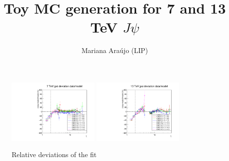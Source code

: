 \documentclass{article}
\begin{document}
\title{Toy MC generation for 7 and 13 TeV $J\psi$}
\author{Mariana Ara\'ujo (LIP)}
\maketitle



\begin{figure}[h!]
\centering
\includegraphics[width = 0.4\textwidth]{xi_devs_jpsi_7.pdf}
\includegraphics[width = 0.4\textwidth]{xi_devs_jpsi_13.pdf}
\caption{Relative deviations of the fit}\label{f:xi_dev}
\end{figure}

\pagebreak
\end{document}
